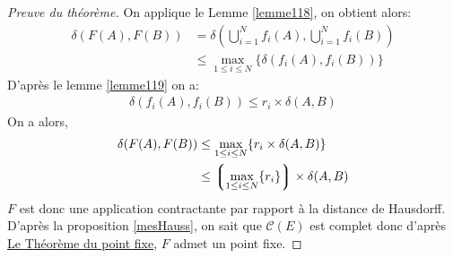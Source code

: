 \documentclass[a4paper, 12pt]{report}
\begin{document}
			\begin{proof}[Preuve du théorème]
				On applique le Lemme \ref{lemme118}, on obtient alors:
				\begin{align*}
					\delta(F(A),F(B))	&=\delta(\bigcup_{i=1}^N f_i(A),\bigcup_{i=1}^N f_i(B))\\
										&\leq\max_{1\leq i\leq N}\{\delta(f_i(A),f_i(B))\}
				\end{align*}
				D'après le lemme \ref{lemme119} on a:
				\begin{align*}
					\delta(f_i(A),f_i(B))\leq r_i\times\delta(A,B)
				\end{align*}
				On a alors,
				\begin{align*}
					\delta(F(A),F(B))	&\leq\max_{1\leq i\leq N}\{r_i\times\delta(A,B)\}\\
										&\leq \left\lgroup\max_{1\leq i\leq N}\{r_i\}\right\rgroup\times\delta(A,B)
				\end{align*}
				$F$ est donc une application contractante par rapport à la distance de Hausdorff. D'après la proposition \ref{mesHauss}, on sait que $\mathcal{C}(E)$ est complet donc d'après \hyperref[ThmPtFixe]{Le Théorème du point fixe}, $F$ admet un point fixe.
			\end{proof}
\newpage
\end{document}
